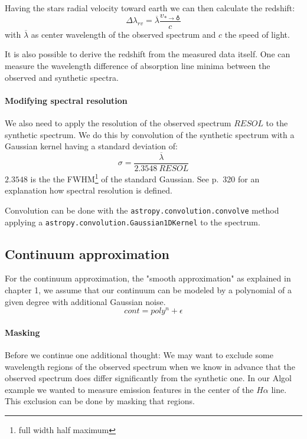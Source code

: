 \documentclass[10pt,a4paper,notitlepage,twocolumn]{article}
\begin{document}
Having the stars radial velocity toward earth we can then calculate the redshift:
\begin{equation}
	\label{eq:dl}
	\Delta\lambda_{rv} = \overline{\lambda} \frac{v_{* \rightarrow \earth}}{c}
\end{equation}
with $\overline{\lambda}$ as center wavelength of the observed spectrum and $c$ the speed of light.

It is also possible to derive the redshift from the measured data itself.
One can measure the wavelength difference of absorption line minima between the observed and synthetic spectra.

\paragraph{Modifying spectral resolution}
We also need to apply the resolution of the observed spectrum $RESOL$ to the synthetic spectrum.
We do this by convolution of the synthetic spectrum with a Gaussian kernel having a standard deviation of:
\begin{equation}
	\sigma = \frac{\overline{\lambda}}{2.3548\ RESOL}
\end{equation}
$2.3548$ is the the FWHM\footnote{full width half maximum} of the standard Gaussian. See \cite{SablowskiSchanne2018} p.\ 320 for an explanation how spectral resolution is defined.

Convolution can be done with the \verb|astropy.convolution.convolve| method applying a \verb|astropy.convolution.Gaussian1DKernel| to the spectrum.

\subsection{Continuum approximation}

For the continuum approximation, the "smooth approximation" as explained in chapter 1, we assume that our continuum can be modeled by a polynomial of a given degree with additional Gaussian noise.
\begin{equation}
	\label{eq:cont_model}
	cont = poly^n + \epsilon
\end{equation}

\paragraph{Masking}
Before we continue one additional thought:
We may want to exclude some wavelength regions of the observed spectrum when we know in advance that the observed spectrum does differ significantly from the synthetic one.
In our Algol example we wanted to measure emission features in the center of the $H\alpha$ line.
This exclusion can be done by masking that regions.
\end{document}
